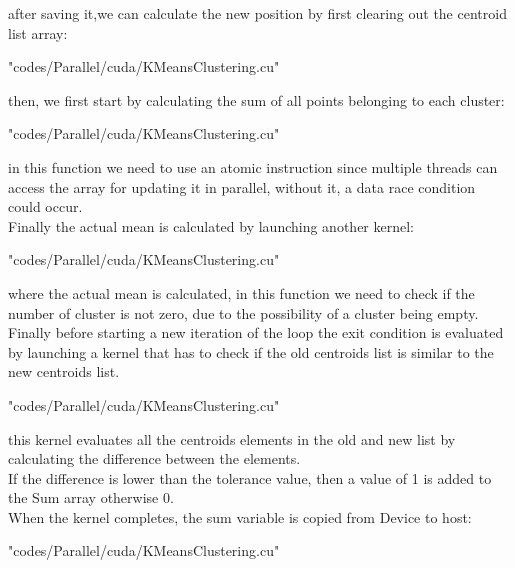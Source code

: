 \documentclass[10pt,twocolumn,letterpaper]{article}
\begin{document}
after saving it,we can calculate the new position by first clearing out the centroid list array:\\
\begin{lstinputlisting}[language=C,style=CSnippetStyle,caption=CUDA Centroid Position Update,firstline=178,lastline=179]{
	"codes/Parallel/cuda/KMeansClustering.cu"}
\end{lstinputlisting}
then, we first start by calculating the sum of all points belonging to each cluster:\\
\begin{lstinputlisting}[language=C,style=CSnippetStyle,caption=CUDA Mean Sum Calculation,firstline=46,lastline=58]{
	"codes/Parallel/cuda/KMeansClustering.cu"}
\end{lstinputlisting}
in this function we need to use an atomic instruction since multiple threads can access the array for updating it in parallel, without 
it, a data race condition could occur.\\
Finally the actual mean is calculated by launching another kernel:\\
\begin{lstinputlisting}[language=C,style=CSnippetStyle,caption=CUDA Mean Calculation,firstline=33,lastline=45]{
	"codes/Parallel/cuda/KMeansClustering.cu"}
\end{lstinputlisting}
where the actual mean is calculated, in this function we need to check if the number of cluster is not zero, due to the possibility of
a cluster being empty.\\
Finally before starting a new iteration of the loop the exit condition is evaluated by launching a kernel that has to check if the old
centroids list is similar to the new centroids list.\\
\begin{lstinputlisting}[language=C,style=CSnippetStyle,caption=CUDA Exit Condition Calculator Kernel,firstline=18,lastline=32]{
	"codes/Parallel/cuda/KMeansClustering.cu"}
\end{lstinputlisting}
this kernel evaluates all the centroids elements in the old and new list by calculating the difference between the elements.\\
If the difference is lower than the tolerance value, then a value of 1 is added to the Sum array otherwise 0.\\
When the kernel completes, the sum variable is copied from Device to host:\\
\begin{lstinputlisting}[language=C,style=CSnippetStyle,caption=CUDA Exit Condition Sum Copy,firstline=129,lastline=129]{
	"codes/Parallel/cuda/KMeansClustering.cu"}
\end{lstinputlisting}
\end{document}
